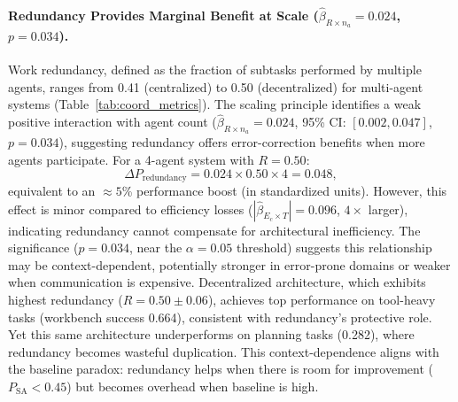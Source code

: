 \paragraph{Redundancy Provides Marginal Benefit at Scale ($\hat{\beta}_{R \times n_a} = 0.024$, $p = 0.034$).}
Work redundancy, defined as the fraction of subtasks performed by multiple agents, ranges from 0.41 (centralized) to 0.50 (decentralized) for multi-agent systems (Table~\ref{tab:coord_metrics}). The scaling principle identifies a weak positive interaction with agent count ($\hat{\beta}_{R \times n_a} = 0.024$, 95\% CI: $[0.002, 0.047]$, $p = 0.034$), suggesting redundancy offers error-correction benefits when more agents participate. For a 4-agent system with $R=0.50$:
\[
\Delta P_{\text{redundancy}} = 0.024 \times 0.50 \times 4 = 0.048,
\]
equivalent to an $\approx 5$\% performance boost (in standardized units). However, this effect is minor compared to efficiency losses ($|\hat{\beta}_{E_c \times T}| = 0.096$, $4\times$ larger), indicating redundancy cannot compensate for architectural inefficiency. The significance ($p = 0.034$, near the $\alpha = 0.05$ threshold) suggests this relationship may be context-dependent, potentially stronger in error-prone domains or weaker when communication is expensive. Decentralized architecture, which exhibits highest redundancy ($R = 0.50 \pm 0.06$), achieves top performance on tool-heavy tasks (workbench success 0.664), consistent with redundancy's protective role. Yet this same architecture underperforms on planning tasks (0.282), where redundancy becomes wasteful duplication. This context-dependence aligns with the baseline paradox: redundancy helps when there is room for improvement ($P_{\text{SA}} < 0.45$) but becomes overhead when baseline is high.

